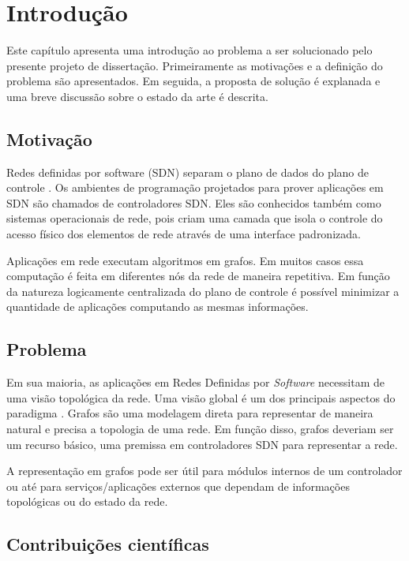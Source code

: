 \chapter{Introdução}
\label{chap:introduction}

Este capítulo apresenta uma introdução ao problema a ser solucionado pelo 
presente projeto de dissertação. 
Primeiramente as motivações e a definição do problema são apresentados. 
Em seguida, a proposta de solução é explanada e uma breve discussão sobre 
o estado da arte é descrita.

\section{Motivação}

Redes definidas por software (SDN) separam o plano de dados do plano 
de controle \citep{guedes2012redes}.
Os ambientes de programação projetados para prover aplicações em SDN são 
chamados de controladores SDN.
Eles são conhecidos também como sistemas operacionais de rede, pois criam uma
camada que isola o controle do acesso físico dos elementos de rede através 
de uma interface padronizada.

Aplicações em rede executam algoritmos em grafos.
Em muitos casos essa computação é feita em diferentes nós da rede de maneira 
repetitiva.
Em função da natureza logicamente centralizada do plano de controle é possível
minimizar a quantidade de aplicações computando as mesmas informações.

\section{Problema}

Em sua maioria, as aplicações em Redes Definidas por \emph{Software} necessitam
de uma visão topológica da rede.
Uma visão global é um dos principais aspectos do paradigma 
\citep{martin2010virtualizing}.
Grafos são uma modelagem direta para representar de maneira natural e precisa 
a topologia de uma rede.
Em função disso, grafos deveriam ser um recurso básico, uma premissa em 
controladores SDN para representar a rede.

A representação em grafos pode ser útil para módulos internos de um controlador
ou até para serviços/aplicações externos que dependam de informações 
topológicas ou do estado da rede.

\section{Contribuições científicas}

